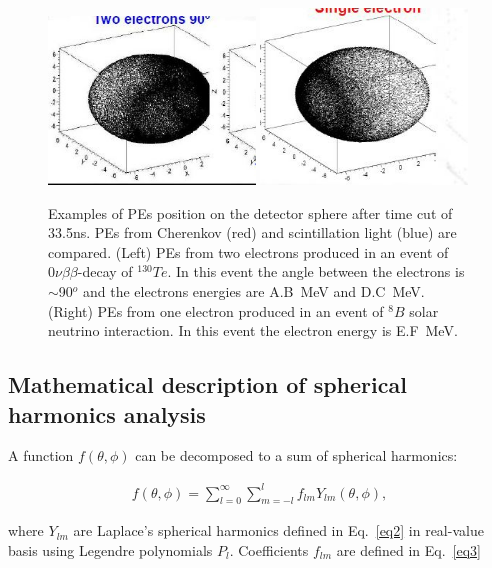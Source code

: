 \documentclass[12pt,twoside,letterpaper]{article}
\newcommand{\vbb}{0\nu\beta\beta}
\newcommand{\Te}{^{130}Te}
\newcommand{\B}{^{8}B}
\begin{document}
\begin{figure}[htb]
\centering
\includegraphics[angle=0,width=0.49\textwidth]{plots/EvtDisplay_two_electrons.JPG}
\includegraphics[angle=0,width=0.49\textwidth]{plots/EvtDisplay_one_electron.JPG}
\caption{Examples of PEs position on the detector sphere after time cut of 33.5ns. PEs from Cherenkov (red) and scintillation light (blue) are compared. (Left) PEs from two electrons produced in an event of $\vbb$-decay of $\Te$. In this event the angle between the electrons is $\sim$90$^o$ and the electrons energies are A.B~MeV and D.C~MeV. (Right) PEs from one electron produced in an event of $\B$ solar neutrino interaction. In this event the electron energy is E.F~MeV.}
\label{fig:EvtDisplay}
\end{figure}

\subsection{Mathematical description of spherical harmonics analysis}
A function $f(\theta,\phi)$ can be decomposed to a sum of spherical harmonics:

\begin{eqnarray}
\label{eq1}
f(\theta,\phi) = \sum_{l=0}^{\infty} \sum_{m=-l}^{l} f_{lm} Y_{lm}(\theta,\phi),
\end{eqnarray}

where $Y_{lm}$ are Laplace's spherical harmonics defined in Eq.~\ref{eq2} in real-value basis using Legendre polynomials $P_l$. Coefficients $f_{lm}$ are defined in Eq.~\ref{eq3} 
\end{document}
